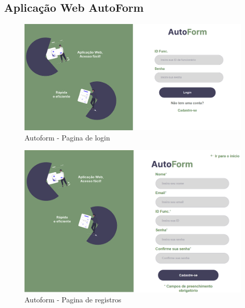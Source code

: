 \subsection{Aplicação Web AutoForm}

\begin{figure}[htb]
    \caption{\label{fig:tela-cadastro}Autoform - Pagina de login}
    \begin{center}
        \includegraphics[scale=0.5]{imagens/login-autoform.png}
    \end{center}
\end{figure}

\begin{figure}[htb]
    \caption{\label{fig:tela-registro}Autoform - Pagina de registros}
    \begin{center}
        \includegraphics[scale=0.6]{imagens/registro-autoform.png}   
     \end{center}
\end{figure}

